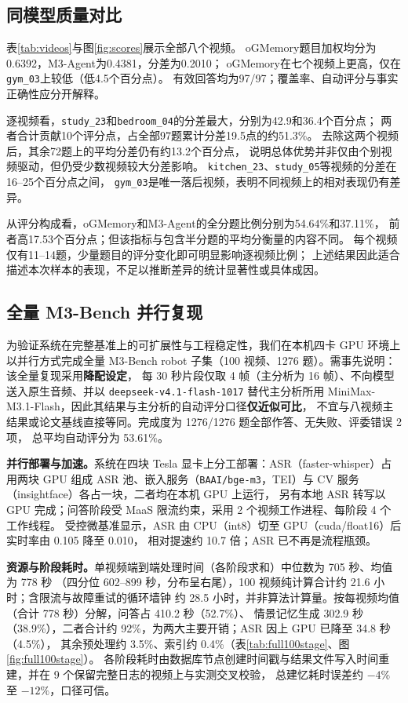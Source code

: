 \documentclass[UTF8,a4paper,11pt,fontset=fandol]{ctexart}
\DeclareRobustCommand{\code}[1]{\nolinkurl{#1}}
\newcommand*{\memoryprojectname}{oGMemory}
\begin{document}
\subsection{同模型质量对比}
表\ref{tab:videos}与图\ref{fig:scores}展示全部八个视频。
\memoryprojectname{}题目加权均分为0.6392，M3-Agent为0.4381，分差为0.2010；
\memoryprojectname{}在七个视频上更高，仅在\code{gym_03}上较低（低4.5个百分点）。
有效回答均为97/97；覆盖率、自动评分与事实正确性应分开解释。

逐视频看，\code{study_23}和\code{bedroom_04}的分差最大，分别为42.9和36.4个百分点；
两者合计贡献10个评分点，占全部97题累计分差19.5点的约51.3\%。
去除这两个视频后，其余72题上的平均分差仍有约13.2个百分点，
说明总体优势并非仅由个别视频驱动，但仍受少数视频较大分差影响。
\code{kitchen_23}、\code{study_05}等视频的分差在16--25个百分点之间，
\code{gym_03}是唯一落后视频，表明不同视频上的相对表现仍有差异。

从评分构成看，\memoryprojectname{}和M3-Agent的全分题比例分别为54.64\%和37.11\%，
前者高17.53个百分点；但该指标与包含半分题的平均分衡量的内容不同。
每个视频仅有11--14题，少量题目的评分变化即可明显影响逐视频比例；
上述结果因此适合描述本次样本的表现，不足以推断差异的统计显著性或具体成因。



\subsection{全量 M3-Bench 并行复现}
为验证系统在完整基准上的可扩展性与工程稳定性，我们在本机四卡 GPU 环境上以并行方式完成全量
M3-Bench robot 子集（100 视频、1276 题）。需事先说明：该全量复现采用\textbf{降配设定}，
每 30 秒片段仅取 4 帧（主分析为 16 帧）、不向模型送入原生音频、并以 \code{deepseek-v4.1-flash-1017}
替代主分析所用 MiniMax-M3.1-Flash，因此其结果与主分析的自动评分口径\textbf{仅近似可比}，
不宜与八视频主结果或论文基线直接等同。完成度为 1276/1276 题全部作答、无失败、评委错误 2 项，
总平均自动评分为 53.61\%。

\textbf{并行部署与加速。}系统在四块 Tesla 显卡上分工部署：ASR（faster-whisper）占用两块 GPU 组成
ASR 池、嵌入服务（\code{BAAI/bge-m3}，TEI）与 CV 服务（insightface）各占一块，二者均在本机 GPU 上运行，
另有本地 ASR 转写以 GPU 完成；问答阶段受 MaaS 限流约束，采用 2 个视频工作进程、每阶段 4 个工作线程。
受控微基准显示，ASR 由 CPU（int8）切至 GPU（cuda/float16）后实时率由 0.105 降至 0.010，
相对提速约 10.7 倍；ASR 已不再是流程瓶颈。

\textbf{资源与阶段耗时。}单视频端到端处理时间（各阶段求和）中位数为 705 秒、均值为 778 秒
（四分位 602--899 秒，分布呈右尾），100 视频纯计算合计约 21.6 小时；含限流与故障重试的循环墙钟
约 28.5 小时，并非算法计算量。按每视频均值（合计 778 秒）分解，问答占 410.2 秒（52.7\%）、
情景记忆生成 302.9 秒（38.9\%），二者合计约 92\%，为两大主要开销；ASR 因上 GPU 已降至 34.8 秒（4.5\%），
其余预处理约 3.5\%、索引约 0.4\%（表\ref{tab:full100stage}、图\ref{fig:full100stage}）。
各阶段耗时由数据库节点创建时间戳与结果文件写入时间重建，并在 9 个保留完整日志的视频上与实测交叉校验，
总建忆耗时误差约 $-4\%$ 至 $-12\%$，口径可信。
\end{document}
